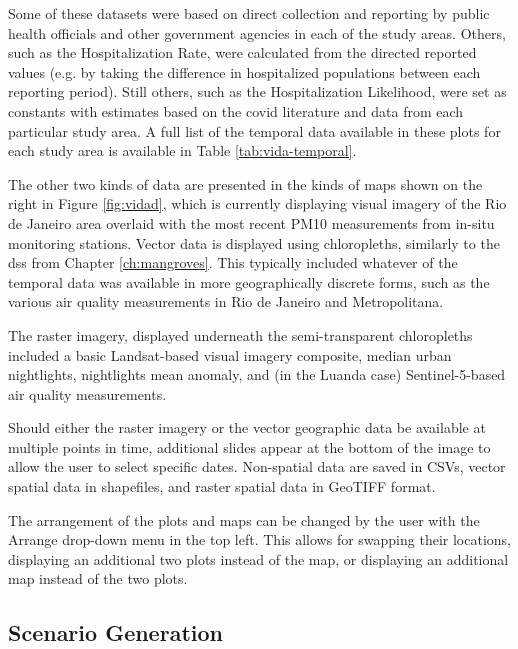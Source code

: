 Some of these datasets were based on direct collection and reporting by public health officials and other government agencies in each of the study areas. Others, such as the Hospitalization Rate, were calculated from the directed reported values (e.g. by taking the difference in hospitalized populations between each reporting period). Still others, such as the Hospitalization Likelihood, were set as constants with estimates based on the \ac{covid} literature and data from each particular study area. A full list of the temporal data available in these plots for each study area is available in Table \ref{tab:vida-temporal}.

The other two kinds of data are presented in the kinds of maps shown on the right in Figure \ref{fig:vidad}, which is currently displaying visual imagery of the Rio de Janeiro area overlaid with the most recent PM10 measurements from in-situ monitoring stations. Vector data is displayed using chloropleths, similarly to the \ac{dss} from Chapter \ref{ch:mangroves}. This typically included whatever of the temporal data was available in more geographically discrete forms, such as the various air quality measurements in Rio de Janeiro and Metropolitana.

The raster imagery, displayed underneath the semi-transparent chloropleths included a basic Landsat-based visual imagery composite, median urban nightlights, nightlights mean anomaly, and (in the Luanda case) Sentinel-5-based air quality measurements.

Should either the raster imagery or the vector geographic data be available at multiple points in time, additional slides appear at the bottom of the image to allow the user to select specific dates. Non-spatial data are saved in CSVs, vector spatial data in shapefiles, and raster spatial data in GeoTIFF format.

The arrangement of the plots and maps can be changed by the user with the Arrange drop-down menu in the top left. This allows for swapping their locations, displaying an additional two plots instead of the map, or displaying an additional map instead of the two plots.

\subsection{Scenario Generation}

